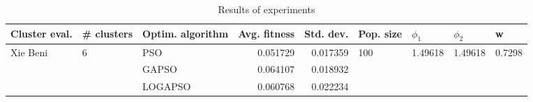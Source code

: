 \begin{table}
\centering
\caption{Results of experiments}
\begin{tabular}{lllrrllll}
\toprule
            Cluster eval. &        \# clusters & Optim. algorithm &  Avg. fitness &  Std. dev. &            Pop. size &               $\phi_{1}$ &               $\phi_{2}$ &                       w \\
\midrule
\multirow{3}{*}{Xie Beni} & \multirow{3}{*}{6} &              PSO &      0.051729 &   0.017359 & \multirow{3}{*}{100} & \multirow{3}{*}{1.49618} & \multirow{3}{*}{1.49618} & \multirow{3}{*}{0.7298} \\
                          &                    &            GAPSO &      0.064107 &   0.018932 &                      &                          &                          &                         \\
                          &                    &          LOGAPSO &      0.060768 &   0.022234 &                      &                          &                          &                         \\
\bottomrule
\end{tabular}
\end{table}
